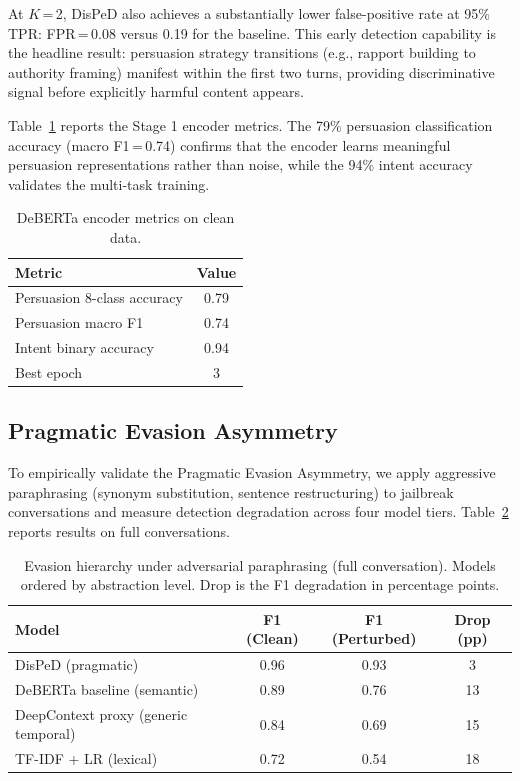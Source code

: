 \documentclass[11pt,a4paper]{article}
\begin{document}
At $K$\,=\,2, DisPeD also achieves a substantially lower false-positive rate at 95\% TPR: FPR\,=\,0.08 versus 0.19 for the baseline. This early detection capability is the headline result: persuasion strategy transitions (e.g., rapport building to authority framing) manifest within the first two turns, providing discriminative signal before explicitly harmful content appears.

Table~\ref{tab:encoder} reports the Stage 1 encoder metrics. The 79\% persuasion classification accuracy (macro F1\,=\,0.74) confirms that the encoder learns meaningful persuasion representations rather than noise, while the 94\% intent accuracy validates the multi-task training.

\begin{table}[t]
\centering
\caption{DeBERTa encoder metrics on clean data.}
\label{tab:encoder}
\begin{tabular}{lc}
\toprule
\textbf{Metric} & \textbf{Value} \\
\midrule
Persuasion 8-class accuracy & 0.79 \\
Persuasion macro F1 & 0.74 \\
Intent binary accuracy & 0.94 \\
Best epoch & 3 \\
\bottomrule
\end{tabular}
\end{table}

\subsection{Pragmatic Evasion Asymmetry}
\label{sec:evasion}

To empirically validate the Pragmatic Evasion Asymmetry, we apply aggressive paraphrasing (synonym substitution, sentence restructuring) to jailbreak conversations and measure detection degradation across four model tiers. Table~\ref{tab:evasion_full} reports results on full conversations.

\begin{table}[t]
\centering
\caption{Evasion hierarchy under adversarial paraphrasing (full conversation). Models ordered by abstraction level. Drop is the F1 degradation in percentage points.}
\label{tab:evasion_full}
\begin{tabular}{lccc}
\toprule
\textbf{Model} & \textbf{F1 (Clean)} & \textbf{F1 (Perturbed)} & \textbf{Drop (pp)} \\
\midrule
DisPeD (pragmatic) & 0.96 & 0.93 & 3 \\
DeBERTa baseline (semantic) & 0.89 & 0.76 & 13 \\
DeepContext proxy (generic temporal) & 0.84 & 0.69 & 15 \\
TF-IDF + LR (lexical) & 0.72 & 0.54 & 18 \\
\bottomrule
\end{tabular}
\end{table}
\end{document}
